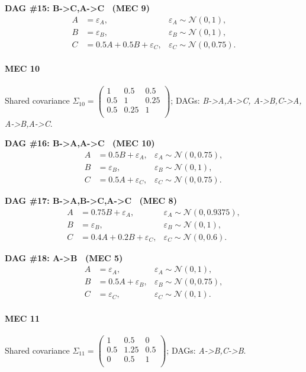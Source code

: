 \documentclass[11pt]{article}
\begin{document}
\noindent\textbf{DAG \#15: B->C,A->C \ (MEC 9)}
\begin{align*}
A &= \varepsilon_A, & \varepsilon_A \sim \mathcal{N}(0, 1),\\B &= \varepsilon_B, & \varepsilon_B \sim \mathcal{N}(0, 1),\\C &= 0.5 A + 0.5 B + \varepsilon_C, & \varepsilon_C \sim \mathcal{N}(0, 0.75).
\end{align*}

\paragraph{MEC 10} Shared covariance \(\Sigma_10=\begin{pmatrix}1 & 0.5 & 0.5 \\0.5 & 1 & 0.25 \\0.5 & 0.25 & 1 \\\end{pmatrix}\); DAGs: \emph{B->A,A->C, A->B,C->A, A->B,A->C}.

\noindent\textbf{DAG \#16: B->A,A->C \ (MEC 10)}
\begin{align*}
A &= 0.5 B + \varepsilon_A, & \varepsilon_A \sim \mathcal{N}(0, 0.75),\\B &= \varepsilon_B, & \varepsilon_B \sim \mathcal{N}(0, 1),\\C &= 0.5 A + \varepsilon_C, & \varepsilon_C \sim \mathcal{N}(0, 0.75).
\end{align*}

\noindent\textbf{DAG \#17: B->A,B->C,A->C \ (MEC 8)}
\begin{align*}
A &= 0.75 B + \varepsilon_A, & \varepsilon_A \sim \mathcal{N}(0, 0.9375),\\B &= \varepsilon_B, & \varepsilon_B \sim \mathcal{N}(0, 1),\\C &= 0.4 A + 0.2 B + \varepsilon_C, & \varepsilon_C \sim \mathcal{N}(0, 0.6).
\end{align*}

\noindent\textbf{DAG \#18: A->B \ (MEC 5)}
\begin{align*}
A &= \varepsilon_A, & \varepsilon_A \sim \mathcal{N}(0, 1),\\B &= 0.5 A + \varepsilon_B, & \varepsilon_B \sim \mathcal{N}(0, 0.75),\\C &= \varepsilon_C, & \varepsilon_C \sim \mathcal{N}(0, 1).
\end{align*}

\paragraph{MEC 11} Shared covariance \(\Sigma_11=\begin{pmatrix}1 & 0.5 & 0 \\0.5 & 1.25 & 0.5 \\0 & 0.5 & 1 \\\end{pmatrix}\); DAGs: \emph{A->B,C->B}.
\end{document}
